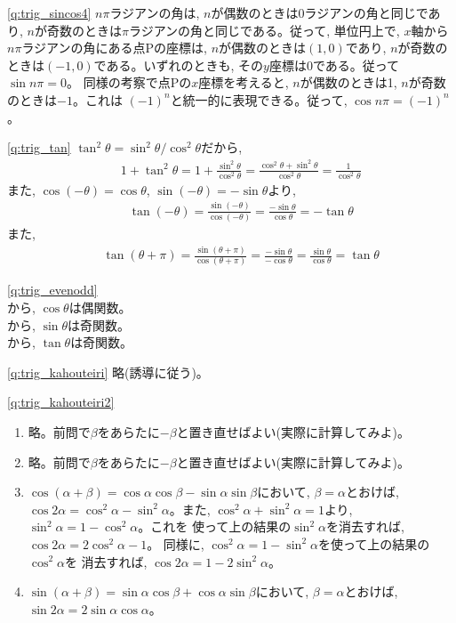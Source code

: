 
\ref{q:trig_sincos4}
$n\pi$ラジアンの角は, $n$が偶数のときは0ラジアンの角と同じであり, 
$n$が奇数のときは$\pi$ラジアンの角と同じである。従って, 単位円上で, 
$x$軸から$n\pi$ラジアンの角にある点Pの座標は, $n$が偶数のときは$(1, 0)$であり, 
$n$が奇数のときは$(-1, 0)$である。いずれのときも, その$y$座標は0である。従って$\sin n\pi=0$。
同様の考察で点Pの$x$座標を考えると, $n$が偶数のときは1, $n$が奇数のときは$-1$。これは
$(-1)^n$と統一的に表現できる。従って, $\cos n\pi=(-1)^n$。\mv

\ref{q:trig_tan}
$\tan^2\theta=\sin^2\theta/\cos^2\theta$だから, 
\begin{eqnarray*}
&&1+\tan^2\theta=1+\frac{\sin^2\theta}{\cos^2\theta}=\frac{\cos^2\theta+\sin^2\theta}{\cos^2\theta}=\frac{1}{\cos^2\theta}
\end{eqnarray*}
また, $\cos(-\theta)=\cos\theta$, $\sin(-\theta)=-\sin\theta$より, 
\begin{eqnarray*}
&&\tan(-\theta) = \frac{\sin(-\theta)}{\cos(-\theta)} = \frac{-\sin\theta}{\cos\theta}=-\tan\theta
\end{eqnarray*}
また, 
\begin{eqnarray*}
&&\tan(\theta+\pi) = \frac{\sin(\theta+\pi)}{\cos(\theta+\pi)}
= \frac{-\sin \theta}{-\cos \theta}
= \frac{\sin \theta}{\cos \theta}
=\tan\theta
\end{eqnarray*}
\mv

\ref{q:trig_evenodd}\\
から, $\cos \theta$は偶関数。\\
から, $\sin \theta$は奇関数。\\
から, $\tan \theta$は奇関数。
\mv

\ref{q:trig_kahouteiri}  略(誘導に従う)。
\mv

\ref{q:trig_kahouteiri2} 
\begin{enumerate}
\item 略。前問で$\beta$をあらたに$-\beta$と置き直せばよい(実際に計算してみよ)。
\item 略。前問で$\beta$をあらたに$-\beta$と置き直せばよい(実際に計算してみよ)。
\item $\cos (\alpha+\beta)=\cos\alpha\cos\beta-\sin\alpha\sin\beta$において, 
$\beta=\alpha$とおけば, $\cos 2\alpha=\cos^2\alpha-\sin^2\alpha$。また, 
$\cos^2\alpha+\sin^2\alpha=1$より, $\sin^2\alpha=1-\cos^2\alpha$。これを
使って上の結果の$\sin^2\alpha$を消去すれば, $\cos 2\alpha=2\cos^2\alpha-1$。
同様に, $\cos^2\alpha=1-\sin^2\alpha$を使って上の結果の$\cos^2\alpha$を
消去すれば, $\cos 2\alpha=1-2\sin^2\alpha$。
\item $\sin (\alpha+\beta)=\sin\alpha\cos\beta+\cos\alpha\sin\beta$において, 
$\beta=\alpha$とおけば, $\sin 2\alpha=2\sin\alpha\cos\alpha$。
\end{enumerate}
\mv


